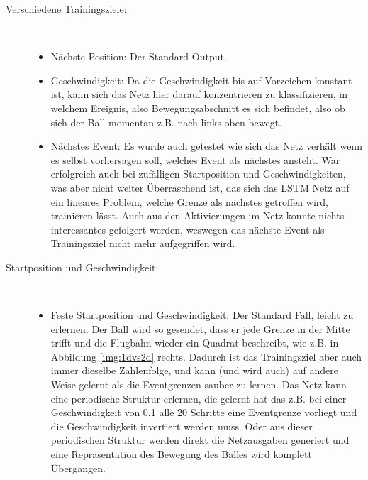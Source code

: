 \begin{description}
	\item[Verschiedene Trainingsziele:] \hfill \\
	\begin{itemize}
	
	\item Nächste Position: Der Standard Output.
	\item Geschwindigkeit: Da die Geschwindigkeit bis auf Vorzeichen konstant ist,  kann sich das Netz hier darauf konzentrieren zu klassifizieren, in welchem Ereignis, also Bewegungsabschnitt es sich befindet, also ob sich der Ball momentan z.B. nach links oben bewegt.  
	\item Nächstes Event: Es wurde auch getestet wie sich das Netz verhält wenn es selbst vorhersagen soll, welches Event als nächstes ansteht. War erfolgreich auch bei zufälligen Startposition und Geschwindigkeiten, was aber nicht weiter Überraschend ist, das sich das LSTM Netz auf ein lineares Problem, welche Grenze als nächstes getroffen wird, trainieren lässt. Auch aus den Aktivierungen im Netz konnte nichts interessantes gefolgert werden, weswegen das nächste Event als Trainingsziel nicht mehr aufgegriffen wird. 
	
\end{itemize}
	\item[Startposition und Geschwindigkeit:]\hfill \\
	\begin{itemize}
		\item Feste Startposition und Geschwindigkeit: Der Standard Fall, leicht zu erlernen. Der Ball wird so gesendet, dass er jede Grenze in der Mitte trifft und die Flugbahn wieder ein Quadrat beschreibt, wie z.B. in Abbildung \ref{img:1dvs2d} rechts. Dadurch ist das Trainingsziel aber auch immer dieselbe Zahlenfolge, und kann (und wird auch) auf andere Weise gelernt als die Eventgrenzen sauber zu lernen. Das Netz kann eine periodische Struktur erlernen, die gelernt hat das z.B. bei einer Geschwindigkeit von 0.1 alle 20 Schritte eine Eventgrenze vorliegt und die Geschwindigkeit invertiert werden muss. Oder aus dieser periodischen Struktur werden direkt die Netzausgaben generiert und eine Repräsentation des Bewegung des Balles wird komplett Übergangen. 
		

\end{itemize}
\end{description}
